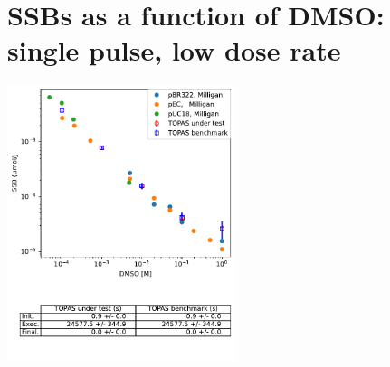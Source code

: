 \documentclass[aspectratio=1610]{beamer}
\begin{document}
\section{SSBs as a function of DMSO: single pulse, low dose rate}

\begin{frame}{\secname}
 \centering
  \includegraphics[width=0.5\textwidth]{./DNASSBPulsed/SSB_vs_DMSO}
\end{frame}
\end{document}
